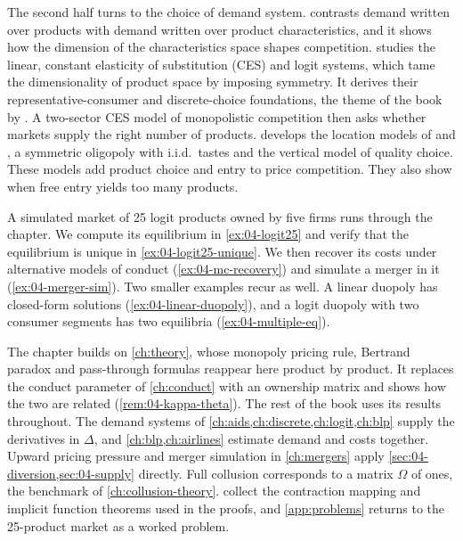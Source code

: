 The second half turns to the choice of demand system.  contrasts demand written over products
with demand written over product characteristics, and it shows how the dimension of the characteristics space
shapes competition.  studies the linear, constant elasticity of substitution (CES) and logit systems, which tame the dimensionality
of product space by imposing symmetry. It derives their representative-consumer and discrete-choice foundations,
the theme of the book by \citet{AndersonDePalmaThisse1992}. A two-sector CES model of monopolistic competition then
asks whether markets supply the right number of products.  develops the location models of
\citet{Hotelling1929} and \citet{Salop1979}, a symmetric oligopoly with i.i.d.\ tastes and the vertical model of
quality choice. These models add product choice and entry to price competition. They also show when free entry
yields too many products.

A simulated market of 25 logit products owned by five firms runs through the chapter. We compute its equilibrium
in \cref{ex:04-logit25} and verify that the equilibrium is unique in \cref{ex:04-logit25-unique}. We then recover
its costs under alternative models of conduct (\cref{ex:04-mc-recovery}) and simulate a merger in it
(\cref{ex:04-merger-sim}). Two smaller examples recur as well. A linear duopoly has closed-form solutions
(\cref{ex:04-linear-duopoly}), and a logit duopoly with two consumer segments has two equilibria
(\cref{ex:04-multiple-eq}).

The chapter builds on \cref{ch:theory}, whose monopoly pricing rule, Bertrand paradox and pass-through formulas
reappear here product by product. It replaces the conduct parameter of \cref{ch:conduct} with an ownership matrix
and shows how the two are related (\cref{rem:04-kappa-theta}). The rest of the book uses its results throughout.
The demand systems of \cref{ch:aids,ch:discrete,ch:logit,ch:blp} supply the derivatives in $\Delta$, and
\cref{ch:blp,ch:airlines} estimate demand and costs together. Upward pricing pressure and merger simulation in
\cref{ch:mergers} apply \cref{sec:04-diversion,sec:04-supply} directly. Full collusion corresponds to a matrix
$\Omega$ of ones, the benchmark of \cref{ch:collusion-theory}.  collect the contraction mapping and
implicit function theorems used in the proofs, and \cref{app:problems} returns to the 25-product market as a
worked problem.






